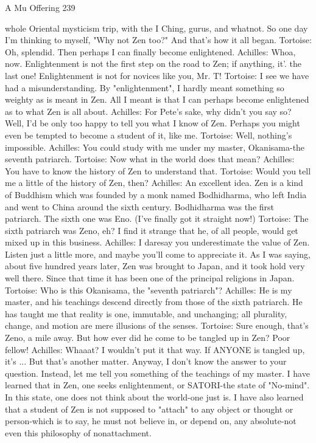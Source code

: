 A Mu Offering                                                                             239

   whole Oriental mysticism trip, with the I Ching, gurus, and whatnot. So one day I'm
   thinking to myself, "Why not Zen too?" And that's how it all began.
Tortoise: Oh, splendid. Then perhaps I can finally become enlightened. Achilles: Whoa,
   now. Enlightenment is not the first step on the road to Zen; if anything, it'. the last
   one! Enlightenment is not for novices like you, Mr. T!
Tortoise: I see we have had a misunderstanding. By "enlightenment", I hardly meant
   something so weighty as is meant in Zen. All I meant is that I can perhaps become
   enlightened as to what Zen is all about. Achilles: For Pete's sake, why didn't you say
   so? Well, I'd be only too happy to tell you what I know of Zen. Perhaps you might
   even be tempted to become a student of it, like me.
Tortoise: Well, nothing's impossible.
Achilles: You could study with me under my master, Okanisama-the seventh patriarch.
Tortoise: Now what in the world does that mean?
Achilles: You have to know the history of Zen to understand that.
Tortoise: Would you tell me a little of the history of Zen, then?
Achilles: An excellent idea. Zen is a kind of Buddhism which was founded by a monk
   named Bodhidharma, who left India and went to China around the sixth century.
   Bodhidharma was the first patriarch. The sixth one was Eno. (I've finally got it
   straight now!)
Tortoise: The sixth patriarch was Zeno, eh? I find it strange that he, of all people, would
   get mixed up in this business.
Achilles: I daresay you underestimate the value of Zen. Listen just a little more, and
   maybe you'll come to appreciate it. As I was saying, about five hundred years later,
   Zen was brought to Japan, and it took hold very well there. Since that time it has been
   one of the principal religions in Japan.
Tortoise: Who is this Okanisama, the "seventh patriarch"?
Achilles: He is my master, and his teachings descend directly from those of the sixth
   patriarch. He has taught me that reality is one, immutable, and unchanging; all
   plurality, change, and motion are mere illusions of the senses.
Tortoise: Sure enough, that's Zeno, a mile away. But how ever did he come to be tangled
   up in Zen? Poor fellow!
Achilles: Whaaat? I wouldn't put it that way. If ANYONE is tangled up, it's ... But that's
   another matter. Anyway, I don't know the answer to your question. Instead, let me tell
   you something of the teachings of my master. I have learned that in Zen, one seeks
   enlightenment, or SATORI-the state of "No-mind". In this state, one does not think
   about the world-one just is. I have also learned that a student of Zen is not supposed
   to "attach" to any object or thought or person-which is to say, he must not believe in,
   or depend on, any absolute-not even this philosophy of nonattachment.




